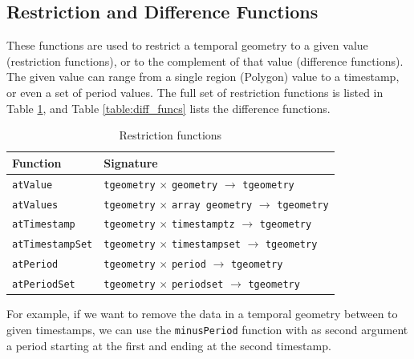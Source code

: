\subsection{Restriction and Difference Functions}
\label{section:restriction_and_difference}

These functions are used to restrict a temporal geometry to a given value (restriction functions), or to the complement of that value (difference functions). The given value can range from a single region (Polygon) value to a timestamp, or even a set of period values. The full set of restriction functions is listed in Table \ref{table:restriction_funcs}, and Table \ref{table:diff_funcs} lists the difference functions.

\begin{table}[h!]
    \centering
    \begin{tabularx}{\textwidth}{|l|X|}
    \hline
    \textbf{Function}   & \textbf{Signature} \\ 
    \hline
    \lstinline+atValue+             & \lstinline+tgeometry+ $\times$ \lstinline+geometry+ $\rightarrow$ \lstinline+tgeometry+\\
    \hline
    \lstinline+atValues+            & \lstinline+tgeometry+ $\times$ \lstinline+array geometry+ $\rightarrow$ \lstinline+tgeometry+\\
    \hline
    \lstinline+atTimestamp+         & \lstinline+tgeometry+ $\times$ \lstinline+timestamptz+ $\rightarrow$ \lstinline+tgeometry+ \\
    \hline
    \lstinline+atTimestampSet+      & \lstinline+tgeometry+ $\times$ \lstinline+timestampset+ $\rightarrow$ \lstinline+tgeometry+ \\
    \hline
    \lstinline+atPeriod+            & \lstinline+tgeometry+ $\times$ \lstinline+period+ $\rightarrow$ \lstinline+tgeometry+ \\
    \hline
    \lstinline+atPeriodSet+         & \lstinline+tgeometry+ $\times$ \lstinline+periodset+ $\rightarrow$ \lstinline+tgeometry+ \\
    \hline
    \end{tabularx}
    \caption{Restriction functions}
    \label{table:restriction_funcs}
\end{table}

For example, if we want to remove the data in a temporal geometry between to given timestamps, we can use the \lstinline{minusPeriod} function with as second argument a period starting at the first and ending at the second timestamp.

